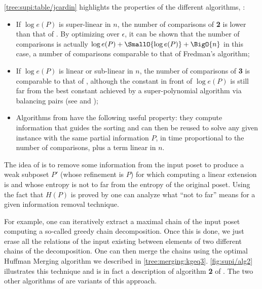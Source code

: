 \ref{tree:supi:table/jcardin} highlights the properties of the different
algorithms, \ie:

\begin{itemize}

\item If $\log e(P)$ is super-linear in $n$, the number of comparisons of
\citet*{cardinal:2013} \textbf{2} is lower than that of \citet*{kahn:1995}. By
optimizing over $\epsilon$, it can be shown that the number of comparisons is
actually $\log e(P) + \SmallO{\log e(P)} + \BigO{n}$ in this case, a number of
comparisons comparable to that of Fredman’s algorithm;

\item If $\log e(P)$ is linear or sub-linear in $n$, the number of comparisons
of \citet*{cardinal:2013} \textbf{3} is comparable to that of
\citet*{kahn:1995}, although the constant in front of $\log e(P)$ is still far
from the best constant achieved by a super-polynomial algorithm via balancing
pairs (see \citet*{brightwell1995balancing} and
\citet*{brightwell1999balanced});

\item Algorithms from \citet*{cardinal:2013} have the following useful
property: they compute information that guides the sorting and can then be
reused to solve any given instance with the same partial information $P$, in
time proportional to the number of comparisons, plus a term linear in $n$.

\end{itemize}

The idea of \citet*{cardinal:2013} is to remove some information from the input
poset to produce a weak subposet \(P'\) (whose refinement is \(P\)) for which
computing a linear extension is  and whose entropy is not to
far from the entropy of the original poset. Using the fact that \(H(P)\) is
 proved by \citet*{kahn:1995} one can analyze what ``not to
far'' means for a given information removal technique.

For example, one can iteratively extract a maximal chain of the input poset
computing a so-called greedy chain decomposition. Once this is done, we just
erase all the relations of the input existing between elements of two different
chains of the decomposition. One can then merge the chains using the optimal
Huffman Merging algorithm we described in \ref{tree:merging:kgeq3}.
\ref{fig:supi/alg2} illustrates this technique and is in fact a description of
algorithm \textbf{2} of \citet{cardinal:2013}. The two other algorithms of
\citet*{cardinal:2013} are variants of this approach.


